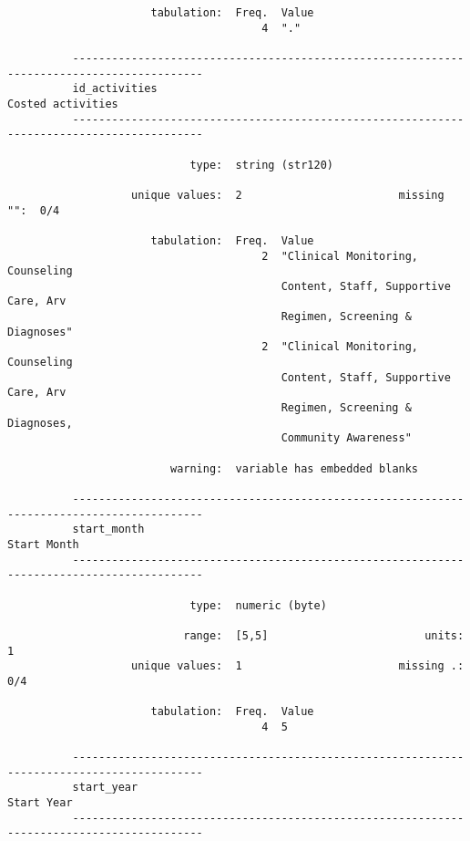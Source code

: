 \documentclass{article}
\begin{document}
\begin{verbatim}
                      tabulation:  Freq.  Value
                                       4  "."
          
          ------------------------------------------------------------------------------------------
          id_activities                                                            Costed activities
          ------------------------------------------------------------------------------------------
          
                            type:  string (str120)
          
                   unique values:  2                        missing "":  0/4
          
                      tabulation:  Freq.  Value
                                       2  "Clinical Monitoring, Counseling
                                          Content, Staff, Supportive Care, Arv
                                          Regimen, Screening & Diagnoses"
                                       2  "Clinical Monitoring, Counseling
                                          Content, Staff, Supportive Care, Arv
                                          Regimen, Screening & Diagnoses,
                                          Community Awareness"
          
                         warning:  variable has embedded blanks
          
          ------------------------------------------------------------------------------------------
          start_month                                                                    Start Month
          ------------------------------------------------------------------------------------------
          
                            type:  numeric (byte)
          
                           range:  [5,5]                        units:  1
                   unique values:  1                        missing .:  0/4
          
                      tabulation:  Freq.  Value
                                       4  5
          
          ------------------------------------------------------------------------------------------
          start_year                                                                      Start Year
          ------------------------------------------------------------------------------------------
          

\end{verbatim}
\end{document}
